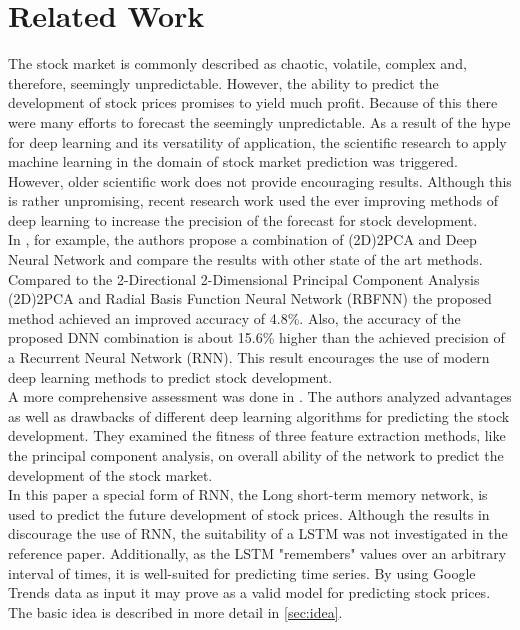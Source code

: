 \section{Related Work}
\label{sec:relatedwork}
The stock market is commonly described as chaotic, volatile, complex and, therefore, seemingly unpredictable. However, the ability to predict the development of stock prices promises to yield much profit. Because of this there were many efforts to forecast the seemingly unpredictable. As a result of the hype for deep learning and its versatility of application, the scientific research to apply machine learning in the domain of stock market prediction was triggered. However, older scientific work does not provide encouraging results. Although this is rather unpromising, recent research work used the ever improving methods of deep learning to increase the precision of the forecast for stock development. 
\\
In \cite{stockprediction01}, for example, the authors propose a combination of (2D)2PCA and Deep Neural Network and compare the results with other state of the art methods. Compared to the 2-Directional 2-Dimensional Principal Component Analysis (2D)2PCA and Radial Basis Function Neural Network (RBFNN) the proposed method achieved an improved accuracy of 4.8\%. Also, the accuracy of the proposed DNN combination is about 15.6\% higher than the achieved precision of a Recurrent Neural Network (RNN). This result encourages the use of modern deep learning methods to predict stock development.
\\
A more comprehensive assessment was done in \cite{stockprediction02}. The authors analyzed advantages as well as drawbacks of different deep learning algorithms for predicting the stock development. They examined the fitness of three feature extraction methods, like the principal component analysis, on overall ability of the network to predict the development of the stock market. 
\\
In this paper a special form of RNN, the Long short-term memory network, is used to predict the future development of stock prices. Although the results in \cite{stockprediction01} discourage the use of RNN, the suitability of a LSTM was not investigated in the reference paper. Additionally, as the LSTM "remembers" values over an arbitrary interval of times, it is well-suited for predicting time series. By using Google Trends data as input it may prove as a valid model for predicting stock prices. The basic idea is described in more detail in \ref{sec:idea}. 